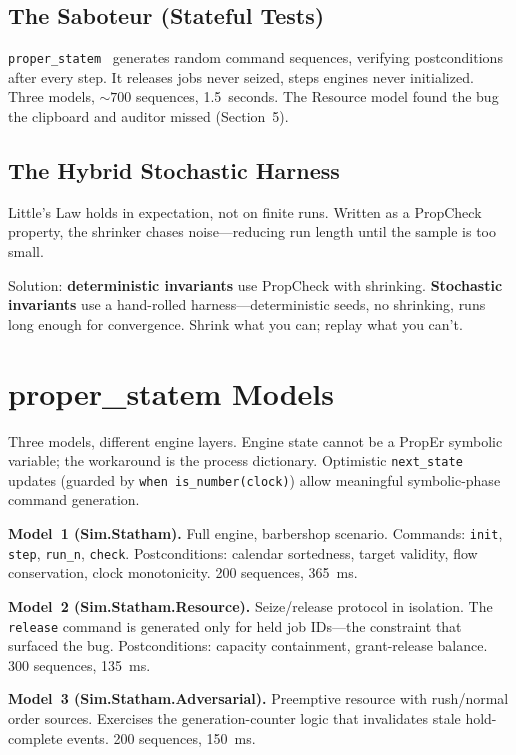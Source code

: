 \documentclass[sigplan,review,anonymous=false]{acmart}
\begin{document}
\subsection{The Saboteur (Stateful Tests)}

\texttt{proper\_statem}~\cite{papadakis2011} generates random command
sequences, verifying postconditions after every step. It releases jobs
never seized, steps engines never initialized. Three models, ${\sim}700$
sequences, 1.5~seconds. The Resource model found the bug the clipboard
and auditor missed (Section~5).

\subsection{The Hybrid Stochastic Harness}

Little's Law holds in expectation, not on finite runs. Written as a
PropCheck property, the shrinker chases noise---reducing run length
until the sample is too small.

Solution: \textbf{deterministic invariants} use PropCheck with
shrinking. \textbf{Stochastic invariants} use a hand-rolled
harness---deterministic seeds, no shrinking, runs long enough for
convergence. Shrink what you can; replay what you can't.


\section{proper\_statem Models}

Three models, different engine layers. Engine state cannot be a PropEr
symbolic variable; the workaround is the process dictionary. Optimistic
\texttt{next\_state} updates (guarded by \texttt{when
is\_number(clock)}) allow meaningful symbolic-phase command generation.

\textbf{Model~1 (Sim.Statham).} Full engine, barbershop scenario.
Commands: \texttt{init}, \texttt{step}, \texttt{run\_n},
\texttt{check}. Postconditions: calendar sortedness, target validity,
flow conservation, clock monotonicity. 200 sequences, 365~ms.

\textbf{Model~2 (Sim.Statham.Resource).} Seize/release protocol in
isolation. The \texttt{release} command is generated only for held job
IDs---the constraint that surfaced the bug. Postconditions: capacity
containment, grant-release balance. 300 sequences, 135~ms.

\textbf{Model~3 (Sim.Statham.Adversarial).} Preemptive resource with
rush/normal order sources. Exercises the generation-counter logic that
invalidates stale hold-complete events. 200 sequences, 150~ms.
\end{document}
